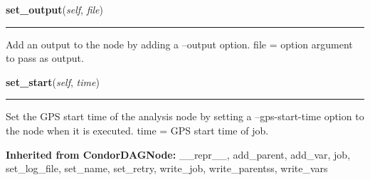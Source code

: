     \label{pipeline:AnalysisNode:set_output}
    \vspace{0.5ex}

    \noindent\begin{boxedminipage}{\textwidth}

    \raggedright \textbf{set\_output}(\textit{self}, \textit{file})

    \vspace{-1.5ex}

    \rule{\textwidth}{0.5\fboxrule}
    Add an output to the node by adding a --output option. file = option 
    argument to pass as output.

    \vspace{1ex}

    \end{boxedminipage}

    \label{pipeline:AnalysisNode:set_start}
    \vspace{0.5ex}

    \noindent\begin{boxedminipage}{\textwidth}

    \raggedright \textbf{set\_start}(\textit{self}, \textit{time})

    \vspace{-1.5ex}

    \rule{\textwidth}{0.5\fboxrule}
    Set the GPS start time of the analysis node by setting a 
    --gps-start-time option to the node when it is executed. time = GPS 
    start time of job.

    \vspace{1ex}

    \end{boxedminipage}

  \textbf{Inherited from CondorDAGNode:}
    \_\_repr\_\_,
    add\_parent,
    add\_var,
    job,
    set\_log\_file,
    set\_name,
    set\_retry,
    write\_job,
    write\_parentss,
    write\_vars


